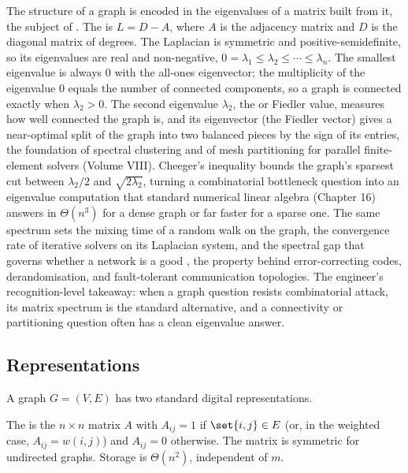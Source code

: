 \begin{mastery}
The structure of a graph is encoded in the eigenvalues of a matrix
built from it, the subject of . The
 is $L = D - A$, where $A$ is the adjacency
matrix and $D$ is the diagonal matrix of degrees. The Laplacian is
symmetric and positive-semidefinite, so its eigenvalues are real and
non-negative, $0 = \lambda_{1} \leq \lambda_{2} \leq \cdots \leq
\lambda_{n}$. The smallest eigenvalue is always $0$ with the
all-ones eigenvector; the multiplicity of the eigenvalue $0$ equals
the number of connected components, so a graph is connected exactly
when $\lambda_{2} > 0$. The second eigenvalue $\lambda_{2}$, the
 or Fiedler value, measures how well
connected the graph is, and its eigenvector (the Fiedler vector)
gives a near-optimal split of the graph into two balanced pieces by
the sign of its entries, the foundation of spectral clustering and
of mesh partitioning for parallel finite-element solvers (Volume
VIII). Cheeger's inequality bounds the graph's sparsest cut between
$\lambda_{2}/2$ and $\sqrt{2 \lambda_{2}}$, turning a combinatorial
bottleneck question into an eigenvalue computation that standard
numerical linear algebra (Chapter 16) answers in $\Theta(n^{3})$ for
a dense graph or far faster for a sparse one. The same spectrum sets
the mixing time of a random walk on the graph, the convergence rate
of iterative solvers on its Laplacian system, and the spectral gap
that governs whether a network is a good , the
property behind error-correcting codes, derandomisation, and
fault-tolerant communication topologies. The engineer's
recognition-level takeaway:
when a graph question resists combinatorial attack, its matrix
spectrum is the standard alternative, and a connectivity or
partitioning question often has a clean eigenvalue answer.
\end{mastery}

\subsection{Representations}

A graph $G = (V, E)$ has two standard digital representations.

The  is the $n \times n$ matrix $A$ with
$A_{ij} = 1$ if $\set{i, j} \in E$ (or, in the weighted case,
$A_{ij} = w(i, j)$) and $A_{ij} = 0$ otherwise. The matrix is
symmetric for undirected graphs. Storage is $\Theta(n^{2})$,
independent of $m$.

